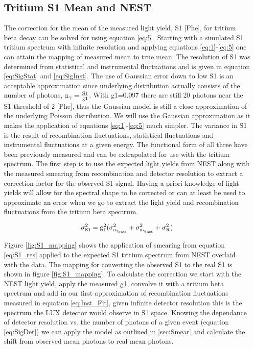 \subsection{Tritium S1 Mean and NEST}

The correction for the mean of the measured light yield, S1 [Phe], for tritium beta decay can be solved for using equation \ref{eq:5}. Starting with a simulated S1 tritium spectrum with infinite resolution and applying equations \ref{eq:1}-\ref{eq:5} one can attain the mapping of measured mean to true mean. The resolution of S1 was determined from statistical and  instrumental fluctuations and is given in equation \ref{eq:SigStat} and \ref{eq:SigInst}. The use of Gaussian error down to low S1 is an acceptable approximation since underlying distribution actually consists of the number of photons, $\rm n_\gamma = \frac{S1}{g1}$. With g1=0.097 there are still 20 photons near the S1 threshold of 2 [Phe], thus the Gaussian model is still a close approximation of the underlying Poisson distribution. We will use the Gaussian approximation as it makes the application of equations \ref{eq:1}-\ref{eq:5} much simpler.
The variance in S1 is the result of recombination fluctuations, statistical fluctuations and instrumental fluctuations at a given energy. The functional form of all three have been previously measured and can be extrapolated for use with the tritium spectrum. The first step is to use the expected light yields from NEST along with the measured smearing from recombination and detector resolution to extract a correction factor for the observed S1 signal. Having a priori knowledge of light yields will allow for the spectral shape to be corrected or can at least be used to approximate an error when we go to extract the light yield and recombination fluctuations from the tritium beta spectrum.

\begin{equation}
 \rm \sigma_{S1}^2=g_1^2(\sigma_{n_{\gamma_{stat}}}^2+\sigma_{n_{\gamma_{inst}}}^2+\sigma_R^2)
\label{eq:S1_res}
\end{equation}

Figure \ref{fig:S1_mapping} shows the application of smearing  from equation \ref{eq:S1_res} applied to the expected S1 tritium spectrum from NEST overlaid with the data. The mapping for converting the observed S1 to the real S1 is shown in figure \ref{fig:S1_mapping}. To calculate the correction we start with the NEST light yield, apply the measured g1, convolve it with a tritium beta spectrum and add in our first approximation of recombination fluctuations measured in equation \ref{eq:Inst_Fit}, given infinite detector resolution this is the spectrum the LUX detector would observe in S1 space. Knowing the dependance of detector resolution vs. the number of photons of a given event (equation \ref{eq:SigDet}) we can apply the model as outlined in \ref{sec:Smear} and calculate the shift from observed mean photons to real mean photons.


